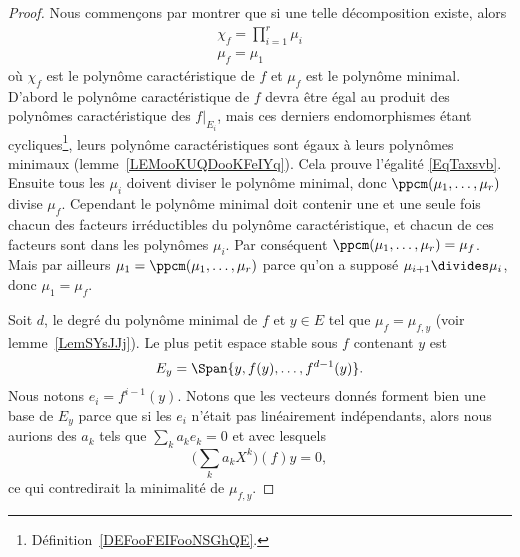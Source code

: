\begin{proof}
    Nous commençons par montrer que si une telle décomposition existe, alors
    \begin{subequations}    \label{subEqzcGouz}
        \begin{align}
            \chi_f=\prod_{i=1}^r\mu_i  \label{EqTaxsvb}\\
            \mu_f=\mu_1
        \end{align}
    \end{subequations}
    où \( \chi_f\) est le polynôme caractéristique de \( f\) et \( \mu_f\) est le polynôme minimal. D'abord le polynôme caractéristique de \( f\) devra être égal au produit des polynômes caractéristique des \( f|_{E_i}\), mais ces derniers endomorphismes étant cycliques\footnote{Définition~\ref{DEFooFEIFooNSGhQE}.}, leurs polynôme caractéristiques sont égaux à leurs polynômes minimaux (lemme~\ref{LEMooKUQDooKFeIYq}). Cela prouve l'égalité \eqref{EqTaxsvb}. Ensuite tous les \( \mu_i\) doivent diviser le polynôme minimal, donc \( \ppcm(\mu_1,\ldots, \mu_r)\) divise \(\mu_f\). Cependant le polynôme minimal doit contenir une et une seule fois chacun des facteurs irréductibles du polynôme caractéristique, et chacun de ces facteurs sont dans les polynômes \( \mu_i\). Par conséquent \( \ppcm(\mu_1,\ldots, \mu_r)=\mu_f\). Mais par ailleurs \( \mu_1=\ppcm(\mu_1,\ldots, \mu_r)\) parce qu'on a supposé \( \mu_{i+1}\divides \mu_i\), donc \( \mu_1=\mu_f\).

    Soit \( d\), le degré du polynôme minimal de \( f\) et \( y\in E\) tel que \( \mu_f=\mu_{f,y}\) (voir lemme~\ref{LemSYsJJj}). Le plus petit espace stable sous \( f\) contenant \( y\) est
    \begin{equation}
        E_y=\Span\{ y,f(y),\ldots, f^{d-1}(y) \}.
    \end{equation}
    Nous notons \( e_i=f^{i-1}(y)\). Notons que les vecteurs donnés forment bien une base de \( E_y\) parce que si les \( e_i\) n'était pas linéairement indépendants, alors nous aurions des \( a_k\) tels que \( \sum_ka_ke_k=0\) et avec lesquels
    \begin{equation}
        \big( \sum_ka_kX^k \big)(f)y=0,
    \end{equation}
    ce qui contredirait la minimalité de \( \mu_{f,y}\).


\end{proof}
